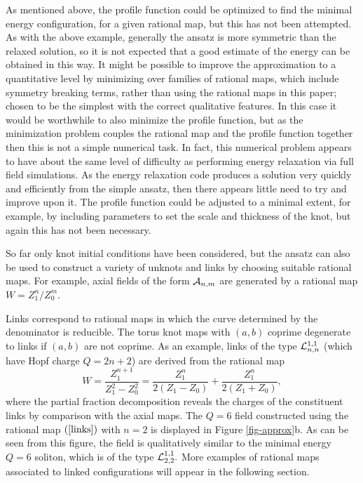 \documentclass[12pt]{article}
\newcommand{\be}{\begin{equation}}
\newcommand{\ee}{\end{equation}}
\begin{document}
As mentioned above, the profile function could be optimized to find
the minimal energy configuration, for a given rational map, but this
has not been attempted. As with the above example, generally the
ansatz is more symmetric than the relaxed solution, so it is not
expected that a good estimate of the energy can be obtained in this
way. It might be possible to improve the approximation to a
quantitative level by minimizing over families of rational maps,
which include symmetry breaking terms, rather than using the
rational maps in this paper; chosen to be the simplest with the
correct qualitative features. In this case it would be worthwhile to
also minimize the profile function, but as the minimization problem
couples the rational map and the profile function together then this
is not a simple numerical task. In fact, this numerical problem
appears to have about the same level of difficulty as performing
energy relaxation via full field simulations. As the energy
relaxation code produces a solution very quickly and efficiently
from the simple ansatz, then there appears little need to try and
improve upon it. The profile function could be adjusted to a minimal
extent, for example, by including parameters to set the scale and
thickness of the knot, but again this has not been necessary.

So far only knot initial conditions have been considered, but the
ansatz can also be used to construct a variety of unknots and links
by choosing suitable rational maps. For example, axial fields of the
form ${\cal A}_{n,m}$ are generated by a rational map
$W=Z_1^n/Z_0^m.$

Links correspond to rational maps in which the curve determined by
the denominator is reducible. The torus knot maps with $(a,b)$
coprime degenerate to links if $(a,b)$ are not coprime. As an
example, links of the type ${\cal L}_{n,n}^{1,1}$ (which have Hopf
charge $Q=2n+2$) are derived from the rational map \be
W=\frac{Z_1^{n+1}}{Z_1^2-Z_0^2} =
\frac{Z_1^n}{2(Z_1-Z_0)}+\frac{Z_1^n}{2(Z_1+Z_0)},\label{links}\ee
where the partial fraction decomposition reveals the charges of the
constituent links by comparison with the axial maps. The $Q=6$
field constructed using the rational map $(\ref{links})$ with $n=2$
is displayed in Figure \ref{fig-approx}b.
 As can be seen from this figure, the
field is qualitatively similar to the minimal energy $Q=6$ soliton,
which is of the type ${\cal L}_{2,2}^{1,1}.$ More examples of
rational maps associated to linked configurations will appear in the
following section.
\end{document}

